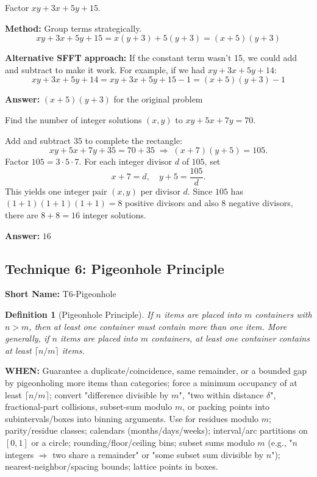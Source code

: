 \documentclass[12pt]{article}
\newtheorem{definition}{Definition}[section]
\newenvironment{problem}[1]
{\begin{tcolorbox}[colback=blue!5!white,colframe=blue!75!black,title={#1}]}{\end{tcolorbox}}
\newenvironment{solution}
{\begin{tcolorbox}[colback=green!5!white,colframe=green!75!black,title={Solution}]}{\end{tcolorbox}}
\begin{document}
\begin{problem}{Example: Factoring with SFFT}
Factor $xy + 3x + 5y + 15$.
\end{problem}

\begin{solution}
\textbf{Method:} Group terms strategically.
$$xy + 3x + 5y + 15 = x(y + 3) + 5(y + 3) = (x + 5)(y + 3)$$

\textbf{Alternative SFFT approach:} If the constant term wasn't 15, we could add and subtract to make it work.
For example, if we had $xy + 3x + 5y + 14$:
$$xy + 3x + 5y + 14 = xy + 3x + 5y + 15 - 1 = (x + 5)(y + 3) - 1$$

\textbf{Answer:} $(x + 5)(y + 3)$ for the original problem
\end{solution}

\begin{problem}{AMC 12 Example}
Find the number of integer solutions $(x,y)$ to $xy + 5x + 7y = 70$.
\end{problem}

\begin{solution}
Add and subtract $35$ to complete the rectangle:
\[
xy + 5x + 7y + 35 = 70 + 35 \;\Longrightarrow\; (x+7)(y+5) = 105.
\]
Factor $105 = 3\cdot 5\cdot 7$. For each integer divisor $d$ of $105$, set
\[
x + 7 = d,\quad y + 5 = \frac{105}{d}.
\]
This yields one integer pair $(x,y)$ per divisor $d$. Since $105$ has $(1+1)(1+1)(1+1)=8$ positive divisors and also 8 negative divisors, there are $8+8=16$ integer solutions.

\textbf{Answer:} $16$
\end{solution}

\subsection{Technique 6: Pigeonhole Principle}
\textbf{Short Name:} T6-Pigeonhole

\begin{definition}[Pigeonhole Principle]
If $n$ items are placed into $m$ containers with $n > m$, then at least one container must contain more than one item. More generally, if $n$ items are placed into $m$ containers, at least one container contains at least $\lceil n/m \rceil$ items.
\end{definition}

\textbf{WHEN:} Guarantee a duplicate/coincidence, same remainder, or a bounded gap by pigeonholing more items than categories; force a minimum occupancy of at least $\lceil n/m \rceil$; convert "difference divisible by $m$", "two within distance $\delta$", fractional-part collisions, subset-sum modulo $m$, or packing points into subintervals/boxes into binning arguments. Use for residues modulo $m$; parity/residue classes; calendars (months/days/weeks); interval/arc partitions on $[0,1]$ or a circle; rounding/floor/ceiling bins; subset sums modulo $m$ (e.g., "$n$ integers $\Rightarrow$ two share a remainder" or "some subset sum divisible by $n$"); nearest-neighbor/spacing bounds; lattice points in boxes.
\end{document}
